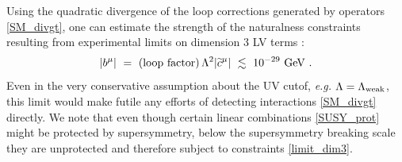 \documentclass[12pt,preprintnumbers,nofootinbib]{revtex4}
\newcommand{\wt}{\widetilde}
\begin{document}
	
	
Using the quadratic divergence of the loop corrections generated by operators \eqref{SM_divgt},
one can estimate the strength of the naturalness constraints resulting from experimental limits 
on dimension 3 LV terms
\cite{Gagnon:2004xh}:
\begin{equation}
\label{limit_dim3}
	| b^\mu | ~=~ ({\rm loop\ factor})\, 
		\Lambda^2 | \wt{c}^\mu |  ~\lesssim~ 10^{-29}~{\rm GeV}~.
\end{equation}
	Even in the very conservative assumption about the UV cutof, 
{\it e.g.} $ \Lambda = \Lambda_{\rm weak} $,
	this limit would make futile any efforts of detecting interactions \eqref{SM_divgt}
	directly. 
	We note that even though certain linear combinations \eqref{SUSY_prot} might
	be protected by supersymmetry, below the supersymmetry breaking 
	scale they are unprotected and therefore subject to constraints \eqref{limit_dim3}. 
	
\end{document}
